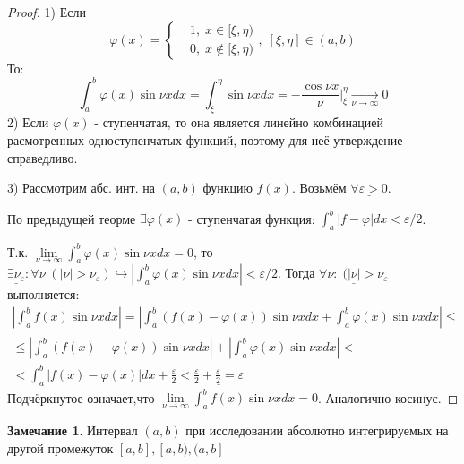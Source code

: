 \documentclass{article}
\theoremstyle{definition}
\numberwithin{theorem}{section}
\numberwithin{lemma}{section}
\numberwithin{definition}{section}
\numberwithin{corollary}{section}
\newtheorem*{remark}{Замечание}
\numberwithin{equation}{section}
\let\phi\varphi
\let\epsilon\varepsilon
\let\true\hookrightarrow
\begin{document}
\begin{proof}
  1) Если 
  \[
    \phi(x) = \left\{\begin{aligned}
      & 1, \; x \in[\xi,\eta) \\ 
      & 0, \; x \notin [\xi,\eta)
    \end{aligned}\right. ,\; [\xi,\eta] \in (a,b)
  \]
  То:
  \[
    \int_{a}^{b}\phi(x)\sin\nu xdx=\int_{\xi}^{\eta}\sin\nu xdx=
    -\frac{\cos \nu x}{\nu}\bigg|_\xi^{\eta} \underset{\nu\to\infty}{\to}0
  \]
  2) Если $\phi(x)$ - ступенчатая, то она является линейно комбинацией
  расмотренных одноступенчатых функций, поэтому для неё утверждение справедливо.

  3) Рассмотрим абс. инт. на $(a,b)$ функцию $f(x)$. Возьмём $ \underline{\forall\epsilon>0}$.

  По предыдущей теорме $\exists \phi(x)$ - ступенчатая функция: $\int_{a}^{b}|f-\phi|dx<\epsilon/2$.

  Т.к. $\lim\limits_{\nu\to \infty }\int_{a}^{b}\phi(x)\sin\nu x dx =0 $, то
  $\underline{\exists \nu_\epsilon }: \forall \nu \; (|\nu|>\nu_\epsilon) \true |\int_{a}^{b}\phi(x)\sin \nu x dx|<\epsilon/2$.
  Тогда $\underline{\forall \nu : \;(|\nu|>\nu_\epsilon}$ выполняется:
  \begin{gather*}
    \underline{|\int_{a}^{b}f(x)\sin\nu x dx|}=|\int_{a}^{b}(f(x)-\phi(x))\sin \nu x dx + \int_{a}^{b}\phi(x)\sin \nu xdx|\le  \\
    \le|\int_{a}^{b}(f(x)-\phi(x))\sin \nu xdx|+|\int_{a}^{b}\phi(x)\sin \nu xdx| < \\
    <\int_{a}^{b}|f(x)-\phi(x)|dx + \frac{\epsilon}{2} < \underline{\frac{\epsilon}{2}+\frac{\epsilon}{2}=\epsilon}
  \end{gather*}
  Подчёркнутое означает,что $\lim\limits_{\nu\to\infty}\int_{a}^{b}f(x)\sin \nu xdx=0$. Аналогично косинус.
\end{proof}
\begin{remark}
  Интервал $(a,b)$ при исследовании абсолютно интегрируемых
  на другой промежуток $[a,b],[a,b),(a,b]$
\end{remark}

\end{document}
